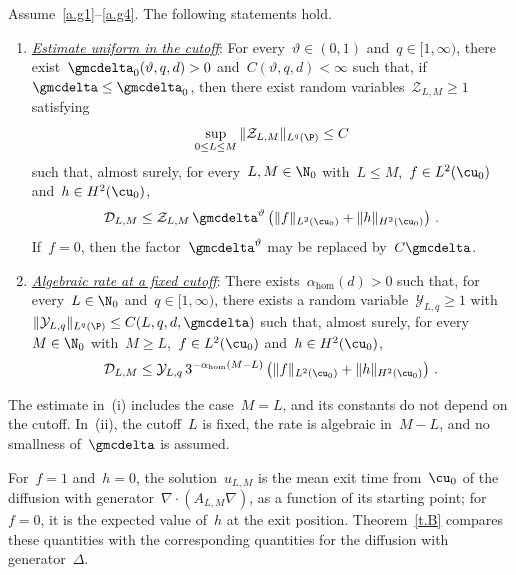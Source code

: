 \documentclass[11pt]{amsart}
\begin{document}
\begin{theoremA}
\label{t.B}
Assume~\ref{a.g1}--\ref{a.g4}. The following statements hold.
\begin{enumerate}[label=(\roman*)]
\item \underline{\emph{Estimate uniform in the cutoff}}: For every~$\vartheta\in(0,1)$ and~$q\in[1,\infty)$, there exist~$\gmcdelta_0(\vartheta,q,d)>0$ and~$C(\vartheta,q,d)<\infty$ such that, if~$\gmcdelta\leq\gmcdelta_0$, then there exist random variables~$\mathcal Z_{L,M}\geq1$ satisfying
\begin{equation*}
	\sup_{0\leq L\leq M}
	\|\mathcal Z_{L,M}\|_{L^q(\P)}
	\leq C
\end{equation*}
such that, almost surely, for every~$L,M\in\N_0$ with~$L\leq M$,~$f\in L^2(\cu_0)$ and~$h\in H^2(\cu_0)$,
\begin{equation*}
	\mathcal D_{L,M}
	\leq
	\mathcal Z_{L,M}\,\gmcdelta^\vartheta
	\left(\|f\|_{L^2(\cu_0)}+\|h\|_{H^2(\cu_0)}\right)\,.
\end{equation*}
If~$f=0$, then the factor~$\gmcdelta^\vartheta$ may be replaced by~$C\gmcdelta$.

\item \underline{\emph{Algebraic rate at a fixed cutoff}}: There exists~$\alpha_{\mathrm{hom}}(d)>0$ such that, for every~$L\in\N_0$ and~$q\in[1,\infty)$, there exists a random variable~$\mathcal Y_{L,q}\geq1$ with~$\|\mathcal Y_{L,q}\|_{L^q(\P)}\leq C(L,q,d,\gmcdelta)$ such that, almost surely, for every~$M\in\N_0$ with~$M\geq L$,~$f\in L^2(\cu_0)$ and~$h\in H^2(\cu_0)$,
\begin{equation*}
	\mathcal D_{L,M}
	\leq
	\mathcal Y_{L,q}\,3^{-\alpha_{\mathrm{hom}}(M-L)}
	\left(\|f\|_{L^2(\cu_0)}+\|h\|_{H^2(\cu_0)}\right)\,.
\end{equation*}
\end{enumerate}
\end{theoremA}

The estimate in~(i) includes the case~$M=L$, and its constants do not depend on the cutoff. In~(ii), the cutoff~$L$ is fixed, the rate is algebraic in~$M-L$, and no smallness of~$\gmcdelta$ is assumed.

\smallskip

For~$f=1$ and~$h=0$, the solution~$u_{L,M}$ is the mean exit time from~$\cu_0$ of the diffusion with generator~$\nabla\cdot(A_{L,M}\nabla)$, as a function of its starting point; for~$f=0$, it is the expected value of~$h$ at the exit position. Theorem~\ref{t.B} compares these quantities with the corresponding quantities for the diffusion with generator~$\Delta$.
\end{document}
